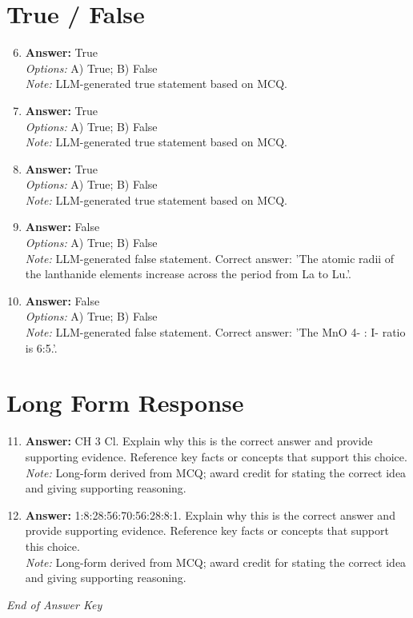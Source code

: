 \documentclass[12pt]{article}
\begin{document}
\section*{True / False}
\begin{enumerate}[label=\arabic*.]
\setcounter{enumi}{5}
\item \textbf{Answer:} True
\\ \textit{Options:} A) True; B) False
\\ \textit{Note:} LLM-generated true statement based on MCQ.
\item \textbf{Answer:} True
\\ \textit{Options:} A) True; B) False
\\ \textit{Note:} LLM-generated true statement based on MCQ.
\item \textbf{Answer:} True
\\ \textit{Options:} A) True; B) False
\\ \textit{Note:} LLM-generated true statement based on MCQ.
\item \textbf{Answer:} False
\\ \textit{Options:} A) True; B) False
\\ \textit{Note:} LLM-generated false statement. Correct answer: 'The atomic radii of the lanthanide elements increase across the period from La to Lu.'.
\item \textbf{Answer:} False
\\ \textit{Options:} A) True; B) False
\\ \textit{Note:} LLM-generated false statement. Correct answer: 'The MnO 4- : I- ratio is 6:5.'.
\end{enumerate}

\section*{Long Form Response}
\begin{enumerate}[label=\arabic*.]
\setcounter{enumi}{10}
\item \textbf{Answer:} CH 3 Cl. Explain why this is the correct answer and provide supporting evidence. Reference key facts or concepts that support this choice.
\\ \textit{Note:} Long-form derived from MCQ; award credit for stating the correct idea and giving supporting reasoning.
\item \textbf{Answer:} 1:8:28:56:70:56:28:8:1. Explain why this is the correct answer and provide supporting evidence. Reference key facts or concepts that support this choice.
\\ \textit{Note:} Long-form derived from MCQ; award credit for stating the correct idea and giving supporting reasoning.
\end{enumerate}

\vfill
\noindent\textit{End of Answer Key}
\end{document}
